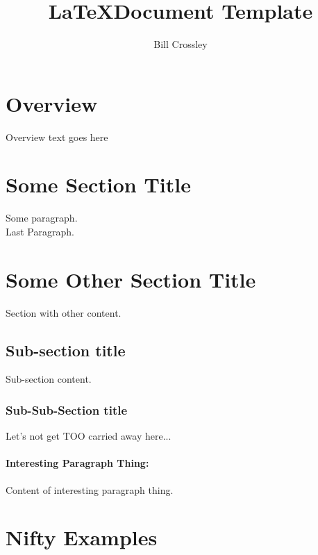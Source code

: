 \documentclass[11pt]{article} %
\title{\LaTeX Document Template}
\author{Bill Crossley}
\begin{document}
\begin{titlepage}
\vfill
\maketitle
\thispagestyle{empty}
\vfill
\end{titlepage}

\pagestyle{mystyle}

\tableofcontents{}

\pagebreak

\section{Overview}

Overview text goes here

\section{Some Section Title}

Some paragraph.\\
\bigskip
Last Paragraph.

\section{Some Other Section Title}

Section with other content.

\subsection{Sub-section title}

Sub-section content.

\subsubsection{Sub-Sub-Section title}

Let's not get TOO carried away here...

\paragraph{Interesting Paragraph Thing:}Content of interesting paragraph thing.

\pagebreak

\section{Nifty Examples}
\end{document}

